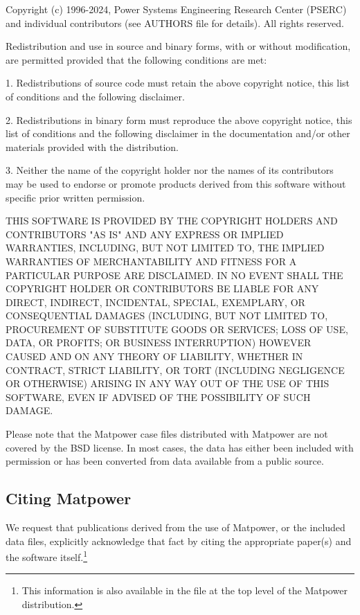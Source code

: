 \documentclass[12pt]{article}
\newcommand{\matpower}[0]{{\sc Matpower}}
\newcommand{\code}[1]{{\relsize{-0.5}{\tt{{#1}}}}}  %
\numberwithin{equation}{section}
\numberwithin{table}{section}
\numberwithin{figure}{section}
\begin{document}
\begin{Notice}
Copyright (c) 1996-2024, Power Systems Engineering Research Center
(PSERC) and individual contributors (see AUTHORS file for details).
All rights reserved.

Redistribution and use in source and binary forms, with or without
modification, are permitted provided that the following conditions
are met:

1. Redistributions of source code must retain the above copyright
notice, this list of conditions and the following disclaimer.

2. Redistributions in binary form must reproduce the above copyright
notice, this list of conditions and the following disclaimer in the
documentation and/or other materials provided with the distribution.

3. Neither the name of the copyright holder nor the names of its
contributors may be used to endorse or promote products derived from
this software without specific prior written permission.

THIS SOFTWARE IS PROVIDED BY THE COPYRIGHT HOLDERS AND CONTRIBUTORS
"AS IS" AND ANY EXPRESS OR IMPLIED WARRANTIES, INCLUDING, BUT NOT
LIMITED TO, THE IMPLIED WARRANTIES OF MERCHANTABILITY AND FITNESS
FOR A PARTICULAR PURPOSE ARE DISCLAIMED. IN NO EVENT SHALL THE
COPYRIGHT HOLDER OR CONTRIBUTORS BE LIABLE FOR ANY DIRECT, INDIRECT,
INCIDENTAL, SPECIAL, EXEMPLARY, OR CONSEQUENTIAL DAMAGES (INCLUDING,
BUT NOT LIMITED TO, PROCUREMENT OF SUBSTITUTE GOODS OR SERVICES;
LOSS OF USE, DATA, OR PROFITS; OR BUSINESS INTERRUPTION) HOWEVER
CAUSED AND ON ANY THEORY OF LIABILITY, WHETHER IN CONTRACT, STRICT
LIABILITY, OR TORT (INCLUDING NEGLIGENCE OR OTHERWISE) ARISING IN
ANY WAY OUT OF THE USE OF THIS SOFTWARE, EVEN IF ADVISED OF THE
POSSIBILITY OF SUCH DAMAGE.
\end{Notice}

Please note that the \matpower{} case files distributed with \matpower{} are not covered by the BSD license. In most cases, the data has either been included with permission or has been converted from data available from a public source.

\subsection{Citing \matpower{}}

We request that publications derived from the use of \matpower{}, or the
included data files, explicitly acknowledge that fact by citing the
appropriate paper(s) and the software itself.\footnote{This information is also available in the \code{CITATION} file at the top level of the \matpower{} distribution.}
\end{document}
